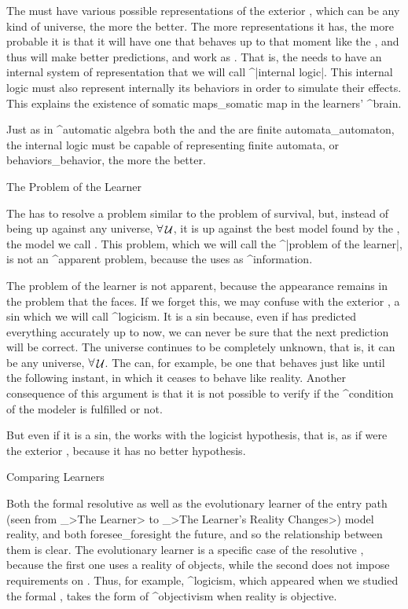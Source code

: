 The {\learner} must have various possible representations of the
exterior {\universe}, which can be any kind of universe, the more the
better. The more representations it has, the more probable it is that it
will have one that behaves up to that moment like the {\universe}, and
thus will make better predictions, and work as {\reality}. That is, the
{\learner} needs to have an internal system of representation that we
will call ^|internal logic|. This internal logic must also represent
internally its {\bodys} behaviors in order to simulate their effects.
This explains the existence of somatic maps_{somatic map} in the
learners' ^{brain}.

Just as in ^{automatic algebra} both the {\universe} and the {\body} are
finite automata_{automaton}, the {\learners} internal logic must be
capable of representing finite automata, or behaviors_{behavior}, the
more the better.


\Section The Problem of the Learner

The {\simulator} has to resolve a problem similar to the problem of
survival, but, instead of being up against any universe, $\forall \aut
U$, it is up against the best model found by the {\modeler}, the model
we call {\reality}. This problem, which we will call the ^|problem of
the learner|, is not an ^{apparent problem}, because the {\simulator}
uses {\reality} as ^{information}.

The problem of the learner is not apparent, because the appearance
remains in the problem that the {\modeler} faces. If we forget this, we
may confuse {\reality} with the exterior {\universe}, a sin which we
will call ^{logicism}. It is a sin because, even if {\reality} has
predicted everything accurately up to now, we can never be sure that the
next prediction will be correct. The universe continues to be completely
unknown, that is, it can be any universe, $\forall \aut U$. The
{\universe} can, for example, be one that behaves just like {\reality}
until the following instant, in which it ceases to behave like reality.
Another consequence of this argument is that it is not possible to
verify if the ^{condition of the modeler} is fulfilled or not.

But even if it is a sin, the {\simulator} works with the logicist
hypothesis, that is, as if {\reality} were the exterior {\universe},
because it has no better hypothesis.


\Section Comparing Learners

Both the formal resolutive {\learner} as well as the evolutionary
learner of the entry path (seen from _>The Learner> to _>The Learner's
Reality Changes>) model reality, and both foresee_{foresight} the
future, and so the relationship between them is clear. The evolutionary
learner is a specific case of the resolutive {\learner}, because the
first one uses a reality of objects, while the second does not impose
requirements on {\reality}. Thus, for example, ^{logicism}, which
appeared when we studied the formal {\learner}, takes the form of
^{objectivism} when reality is objective.

